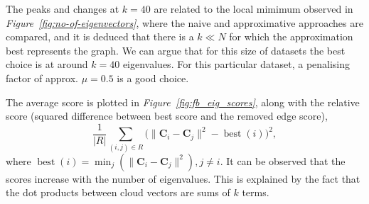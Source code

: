\documentclass[12pt]{report}
\begin{document}
The peaks and changes at $k=40$ are related to the local mimimum observed in
\emph{Figure~\ref{fig:no-of-eigenvectors}}, where the naive and approximative
approaches are compared, and it is deduced that there is a $k \ll N$ for which
the approximation best represents the graph. We can argue that for this size of
datasets the best choice is at around $k=40$ eigenvalues. For this particular
dataset, a penalising factor of approx. $\mu = 0.5$ is a good choice.


The average score is plotted in \emph{Figure~\ref{fig:fb_eig_scores}}, along
with the relative score (squared difference between best score and the removed
edge score),
\begin{equation}
  \frac{1}{|R|} \sum_{(i,j) \in R}
    \big(\|\bm{C}_i - \bm{C}_j\|^2 - \operatorname{best}(i)\big)^2,
\end{equation}
where $\operatorname{best}(i) = \min_{j} (\|\bm{C}_i - \bm{C}_j\|^2), j \neq i $.
It can be observed that the scores increase with the number of eigenvalues. This
is explained by the fact that the dot products between cloud vectors are sums of
$k$ terms.
\end{document}
